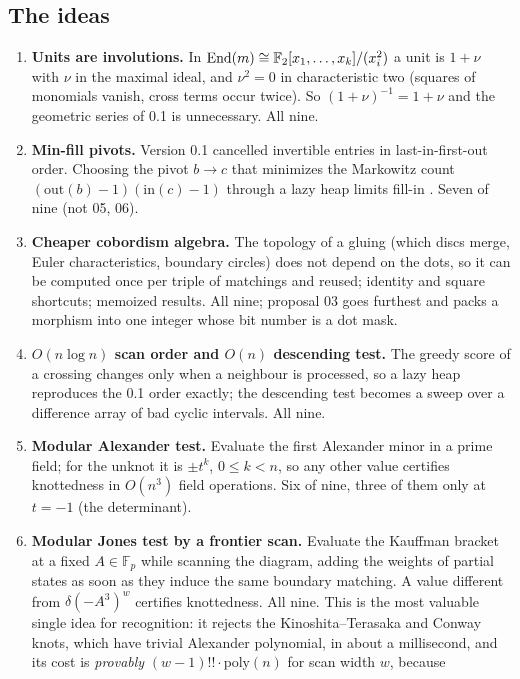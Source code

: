 \subsection{The ideas}
\begin{enumerate}
\item \textbf{Units are involutions.} In
  $\operatorname{End}(m)\cong\mathbb{F}_2[x_1,\dots,x_k]/(x_i^2)$ a unit is $1+\nu$ with
  $\nu$ in the maximal ideal, and $\nu^2=0$ in characteristic two (squares of
  monomials vanish, cross terms occur twice). So $(1+\nu)^{-1}=1+\nu$ and the
  geometric series of 0.1 is unnecessary. All nine.
\item \textbf{Min-fill pivots.} Version 0.1 cancelled invertible entries in
  last-in-first-out order. Choosing the pivot $b\to c$ that minimizes the
  Markowitz count $(\mathrm{out}(b)-1)(\mathrm{in}(c)-1)$ through a lazy heap
  limits fill-in \cite{markowitz}. Seven of nine (not 05, 06).
\item \textbf{Cheaper cobordism algebra.} The topology of a gluing (which discs
  merge, Euler characteristics, boundary circles) does not depend on the dots,
  so it can be computed once per triple of matchings and reused; identity and
  square shortcuts; memoized results. All nine; proposal 03 goes furthest and
  packs a morphism into one integer whose bit number is a dot mask.
\item \textbf{$O(n\log n)$ scan order and $O(n)$ descending test.} The greedy
  score of a crossing changes only when a neighbour is processed, so a lazy
  heap reproduces the 0.1 order exactly; the descending test becomes a sweep
  over a difference array of bad cyclic intervals. All nine.
\item \textbf{Modular Alexander test.} Evaluate the first Alexander minor in a
  prime field; for the unknot it is $\pm t^k$, $0\le k<n$, so any other value
  certifies knottedness in $O(n^3)$ field operations. Six of nine, three of
  them only at $t=-1$ (the determinant).
\item \textbf{Modular Jones test by a frontier scan.} Evaluate the Kauffman
  bracket at a fixed $A\in\mathbb F_p$ while scanning the diagram, adding the
  weights of partial states as soon as they induce the same boundary matching.
  A value different from $\delta(-A^3)^{w}$ certifies knottedness. All nine.
  This is the most valuable single idea for recognition: it rejects the
  Kinoshita--Terasaka and Conway knots, which have trivial Alexander
  polynomial, in about a millisecond, and its cost is \emph{provably}
  $(w-1)!!\cdot\mathrm{poly}(n)$ for scan width $w$, because

\end{enumerate}
